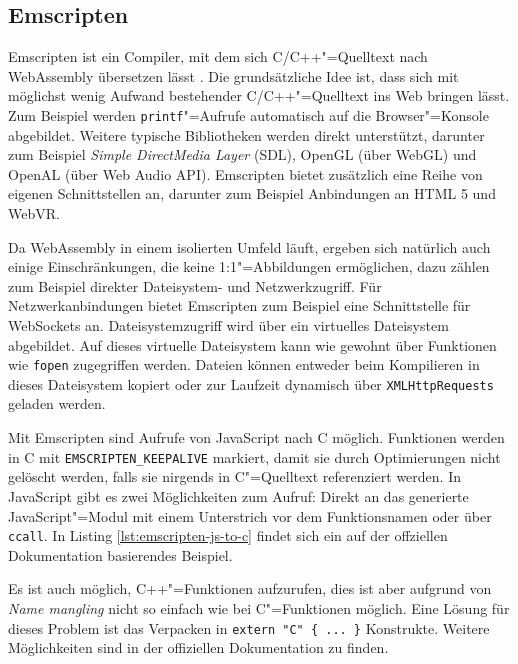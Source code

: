 \subsection{Emscripten}

Emscripten ist ein Compiler, mit dem sich C/C++"=Quelltext nach WebAssembly übersetzen lässt \cite{Emscripten}. Die grundsätzliche Idee ist, dass sich mit möglichst wenig Aufwand bestehender C/C++"=Quelltext ins Web bringen lässt. Zum Beispiel werden \lstinline{printf}"=Aufrufe automatisch auf die Browser"=Konsole abgebildet. Weitere typische Bibliotheken werden direkt unterstützt, darunter zum Beispiel \emph{Simple DirectMedia Layer} (SDL), OpenGL (über WebGL) und OpenAL (über Web Audio API). Emscripten bietet zusätzlich eine Reihe von eigenen Schnittstellen an, darunter zum Beispiel Anbindungen an HTML 5 und WebVR.

Da WebAssembly in einem isolierten Umfeld läuft, ergeben sich natürlich auch einige Einschränkungen, die keine 1:1"=Abbildungen ermöglichen, dazu zählen zum Beispiel direkter Dateisystem- und Netzwerkzugriff. Für Netzwerkanbindungen bietet Emscripten zum Beispiel eine Schnittstelle für WebSockets an. Dateisystemzugriff wird über ein virtuelles Dateisystem abgebildet. Auf dieses virtuelle Dateisystem kann wie gewohnt über Funktionen wie \lstinline{fopen} zugegriffen werden. Dateien können entweder beim Kompilieren in dieses Dateisystem kopiert oder zur Laufzeit dynamisch über \lstinline{XMLHttpRequests} geladen werden.

Mit Emscripten sind Aufrufe von JavaScript nach C möglich. Funktionen werden in C mit \lstinline{EMSCRIPTEN_KEEPALIVE} markiert, damit sie durch Optimierungen nicht gelöscht werden, falls sie nirgends in C"=Quelltext referenziert werden. In JavaScript gibt es zwei Möglichkeiten zum Aufruf: Direkt an das generierte JavaScript"=Modul mit einem Unterstrich vor dem Funktionsnamen oder über \lstinline{ccall}. In Listing \ref{lst:emscripten-js-to-c} findet sich ein auf der offziellen Dokumentation basierendes Beispiel.



Es ist auch möglich, C++"=Funktionen aufzurufen, dies ist aber aufgrund von \emph{Name mangling} nicht so einfach wie bei C"=Funktionen möglich. Eine Lösung für dieses Problem ist das Verpacken in \lstinline|extern "C" { ... }| Konstrukte. Weitere Möglichkeiten sind in der offiziellen Dokumentation zu finden.

